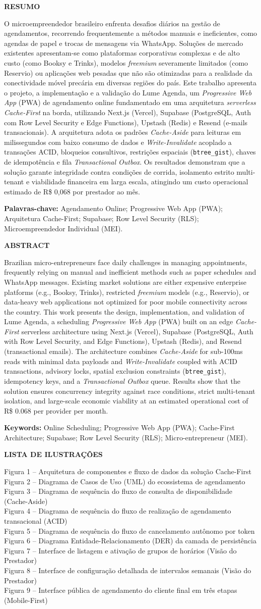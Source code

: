\documentclass[12pt,a4paper]{article}
\newcommand{\textoResumo}{O microempreendedor brasileiro enfrenta desafios diários na gestão de agendamentos, recorrendo frequentemente a métodos manuais e ineficientes, como agendas de papel e trocas de mensagens via WhatsApp. Soluções de mercado existentes apresentam-se como plataformas corporativas complexas e de alto custo (como Booksy e Trinks), modelos \textit{freemium} severamente limitados (como Reservio) ou aplicações web pesadas que não são otimizadas para a realidade da conectividade móvel precária em diversas regiões do país. Este trabalho apresenta o projeto, a implementação e a validação do Lume Agenda, um \textit{Progressive Web App} (PWA) de agendamento online fundamentado em uma arquitetura \textit{serverless Cache-First} na borda, utilizando Next.js (Vercel), Supabase (PostgreSQL, Auth com Row Level Security e Edge Functions), Upstash (Redis) e Resend (e-mails transacionais). A arquitetura adota os padrões \textit{Cache-Aside} para leituras em milissegundos com baixo consumo de dados e \textit{Write-Invalidate} acoplado a transações ACID, bloqueios consultivos, restrições espaciais (\texttt{btree\_gist}), chaves de idempotência e fila \textit{Transactional Outbox}. Os resultados demonstram que a solução garante integridade contra condições de corrida, isolamento estrito multi-tenant e viabilidade financeira em larga escala, atingindo um custo operacional estimado de R\$ 0,068 por prestador ao mês.}
\newcommand{\textoAbstract}{Brazilian micro-entrepreneurs face daily challenges in managing appointments, frequently relying on manual and inefficient methods such as paper schedules and WhatsApp messages. Existing market solutions are either expensive enterprise platforms (e.g., Booksy, Trinks), restricted \textit{freemium} models (e.g., Reservio), or data-heavy web applications not optimized for poor mobile connectivity across the country. This work presents the design, implementation, and validation of Lume Agenda, a scheduling \textit{Progressive Web App} (PWA) built on an edge \textit{Cache-First} serverless architecture using Next.js (Vercel), Supabase (PostgreSQL, Auth with Row Level Security, and Edge Functions), Upstash (Redis), and Resend (transactional emails). The architecture combines \textit{Cache-Aside} for sub-100ms reads with minimal data payloads and \textit{Write-Invalidate} coupled with ACID transactions, advisory locks, spatial exclusion constraints (\texttt{btree\_gist}), idempotency keys, and a \textit{Transactional Outbox} queue. Results show that the solution ensures concurrency integrity against race conditions, strict multi-tenant isolation, and large-scale economic viability at an estimated operational cost of R\$ 0.068 per provider per month.}
\begin{document}
\newpage
\pagestyle{empty}

\centering
{ \textbf{RESUMO} \par}
\vspace{1cm}
\justifying

\noindent
\textoResumo

\vspace{1cm}
\noindent
\textbf{Palavras-chave:} Agendamento Online; Progressive Web App (PWA); Arquitetura Cache-First; Supabase; Row Level Security (RLS); Microempreendedor Individual (MEI).

\newpage
\pagestyle{empty}

\centering
{ \textbf{ABSTRACT} \par}
\vspace{1cm}
\justifying

\noindent
\textoAbstract

\vspace{1cm}
\noindent
\textbf{Keywords:} Online Scheduling; Progressive Web App (PWA); Cache-First Architecture; Supabase; Row Level Security (RLS); Micro-entrepreneur (MEI).

\newpage
\pagestyle{empty}

\centering
{\textbf{LISTA DE ILUSTRAÇÕES} \par}
\vspace{0.8cm}
\justifying
\noindent
Figura 1 -- Arquitetura de componentes e fluxo de dados da solução Cache-First \dotfill \pageref{arquitetura} \\
Figura 2 -- Diagrama de Casos de Uso (UML) do ecossistema de agendamento \dotfill \pageref{fig:casos_uso} \\
Figura 3 -- Diagrama de sequência do fluxo de consulta de disponibilidade (Cache-Aside) \dotfill \pageref{fig:seq_leitura} \\
Figura 4 -- Diagrama de sequência do fluxo de realização de agendamento transacional (ACID) \dotfill \pageref{fig:seq_escrita} \\
Figura 5 -- Diagrama de sequência do fluxo de cancelamento autônomo por token \dotfill \pageref{fig:seq_cancelamento} \\
Figura 6 -- Diagrama Entidade-Relacionamento (DER) da camada de persistência \dotfill \pageref{fig:der_banco} \\
Figura 7 -- Interface de listagem e ativação de grupos de horários (Visão do Prestador) \dotfill \pageref{fig:config_regras_home} \\
Figura 8 -- Interface de configuração detalhada de intervalos semanais (Visão do Prestador) \dotfill \pageref{fig:config_regras_detalhes} \\
Figura 9 -- Interface pública de agendamento do cliente final em três etapas (Mobile-First) \dotfill \pageref{fig:agendamento}
\end{document}
